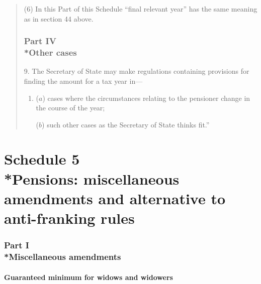 \documentclass[12pt,a4paper]{article}
\begin{document}
\begin{quotation}
(6) In this Part of this Schedule “final relevant year” has the same meaning as in section 44 above.

\section*{Part IV\\*Other cases}

9. The Secretary of State may make regulations containing provisions for finding the amount for a tax year in—
\begin{enumerate}\item[]
($a$) cases where the circumstances relating to the pensioner change in the course of the year;

($b$) such other cases as the Secretary of State thinks fit.”
\end{enumerate}
\end{quotation}

\part[Schedule 5 --- Pensions: miscellaneous amendments and alternative to anti-franking rules]{Schedule 5\\*Pensions: miscellaneous amendments and alternative to anti-franking rules}

\section[Part I --- Miscellaneous amendments]{Part I\\*Miscellaneous amendments}

\renewcommand\parthead{--- Schedule 5 Part I}

\subsection*{Guaranteed minimum for widows and widowers}
\end{document}
